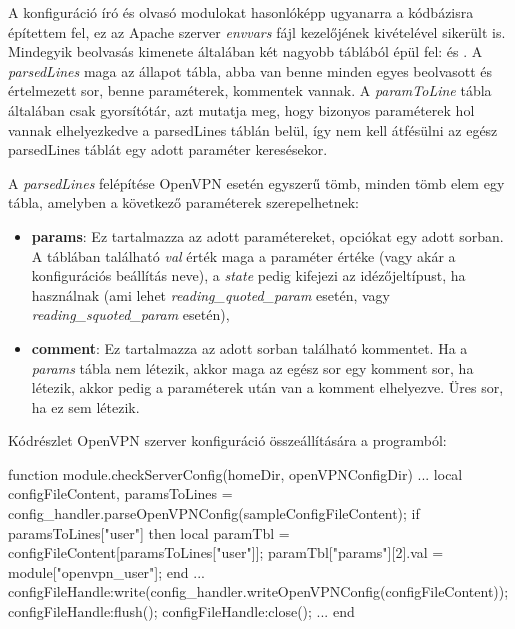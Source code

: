 A konfiguráció író és olvasó modulokat hasonlóképp ugyanarra a kódbázisra építettem fel, ez az Apache szerver \textit{envvars} fájl kezelőjének kivételével sikerült is. Mindegyik beolvasás kimenete általában két nagyobb táblából épül fel: \textit{} és \textit{}.
A \textit{parsedLines} maga az állapot tábla, abba van benne minden egyes beolvasott és értelmezett sor, benne paraméterek, kommentek vannak. A \textit{paramToLine} tábla általában csak gyorsítótár, azt mutatja meg, hogy bizonyos paraméterek hol vannak elhelyezkedve a parsedLines táblán belül, így nem kell átfésülni az egész parsedLines táblát egy adott paraméter keresésekor.

A \textit{parsedLines} felépítése OpenVPN esetén egyszerű tömb, minden tömb elem egy tábla, amelyben a következő paraméterek szerepelhetnek:

\begin{itemize}
    \item \textbf{params}: Ez tartalmazza az adott paramétereket, opciókat egy adott sorban. A táblában található \textit{val} érték maga a paraméter értéke (vagy akár a konfigurációs beállítás neve), a \textit{state} pedig kifejezi az idézőjeltípust, ha használnak (ami lehet \textit{reading\_quoted\_param}  esetén, vagy \textit{reading\_squoted\_param}  esetén),
    \item \textbf{comment}: Ez tartalmazza az adott sorban található kommentet. Ha a \textit{params} tábla nem létezik, akkor maga az egész sor egy komment sor, ha létezik, akkor pedig a paraméterek után van a komment elhelyezve. Üres sor, ha ez sem létezik.
\end{itemize}

Kódrészlet OpenVPN szerver konfiguráció összeállítására a programból:

\begin{lua}
function module.checkServerConfig(homeDir, openVPNConfigDir)
...
    local configFileContent, paramsToLines = config_handler.parseOpenVPNConfig(sampleConfigFileContent);
    if paramsToLines["user"] then
        local paramTbl = configFileContent[paramsToLines["user"]];
        paramTbl["params"][2].val = module["openvpn_user"];
    end
...
    configFileHandle:write(config_handler.writeOpenVPNConfig(configFileContent));
    configFileHandle:flush();
    configFileHandle:close();
...
end
\end{lua}
\pagebreak

